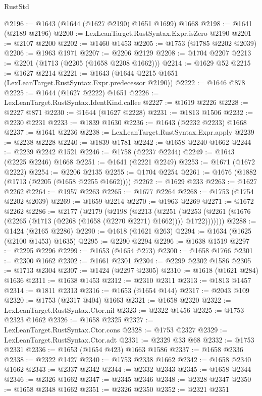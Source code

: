 \begin{lexlean}{RustStd}
\begin{coremodule}
@2196 := @1643 (@1644 (@1627 @2190) @1651 @1699) @1668
@2198 := @1641 (@2189 @2196)
@2200 := LexLeanTarget.RustSyntax.Expr.isZero @2190
@2201 := @2107 @2200
@2202 := @1460 @1453
@2205 := @1753 (@1785 @2202 @2039)
@2206 := @1963 @1971
@2207 := @2206 @2129
@2208 := @1704 @2207
@2213 := @2201 (@1713 (@2205 (@1658 @2208 @1662)))
@2214 := @1629 @52
@2215 := @1627 @2214
@2221 := @1643 (@1644 @2215 @1651 (LexLeanTarget.RustSyntax.Expr.predecessor @2190))
@2222 := @1646 @878
@2225 := @1644 (@1627 @2222) @1651
@2226 := LexLeanTarget.RustSyntax.IdentKind.callee
@2227 := @1619 @2226
@2228 := @2227 @871
@2230 := @1644 (@1627 @2228)
@2231 := @1813 @1506
@2232 := @2230 @2231
@2233 := @1839 @1630
@2236 := @1643 (@2232 @2233) @1668
@2237 := @1641 @2236
@2238 := LexLeanTarget.RustSyntax.Expr.apply
@2239 := @2238 @2228
@2240 := @1839 @1781
@2242 := @1658 @2240 @1662
@2244 := @2239 @2242 @1521
@2246 := @1758 (@2237 @2244)
@2249 := @1643 (@2225 @2246) @1668
@2251 := @1641 (@2221 @2249)
@2253 := @1671 (@1672 @2222)
@2254 := @2206 @2135
@2255 := @1704 @2254
@2261 := @1676 (@1882 (@1713 (@2205 (@1658 @2255 @1662))))
@2262 := @1629 @233
@2263 := @1627 @2262
@2264 := @1957 @2263
@2265 := @1677 @2264
@2268 := @1753 (@1754 @2202 @2039)
@2269 := @1659 @2214
@2270 := @1963 @2269
@2271 := @1672 @2262
@2286 := @2177
    (@2179
      (@2198
        (@2213
          (@2251
            (@2253 (@2261 (@1676 (@2265 (@1713 (@2268 (@1658 (@2270 @2271) @1662)))) @1722)))))))
@2288 := @1424 (@2165 @2286)
@2290 := @1618 (@1621 @263)
@2294 := @1634 (@1625 (@2100 @1453) @1635)
@2295 := @2290 @2294
@2296 := @1638 @1519
@2297 := @2295 @2296
@2299 := @1653 (@1654 @273)
@2300 := @1658 @1766
@2301 := @2300 @1662
@2302 := @1661 @2301
@2304 := @2299 @2302 @1586
@2305 := @1713 @2304
@2307 := @1424 (@2297 @2305)
@2310 := @1618 (@1621 @284) @1636
@2311 := @1638 @1453
@2312 := @2310 @2311
@2313 := @1813 @1457
@2314 := @1811 @2313
@2316 := @1653 (@1654 @144)
@2317 := @2043 @109
@2320 := @1753 (@2317 @404) @1663
@2321 := @1658 @2320
@2322 := LexLeanTarget.RustSyntax.Ctor.nil
@2323 := @2322 @1456
@2325 := @1753 @2323 @1662
@2326 := @1658 @2325
@2327 := LexLeanTarget.RustSyntax.Ctor.cons
@2328 := @1753 @2327
@2329 := LexLeanTarget.RustSyntax.Ctor.adt
@2331 := @2329 @33 @68
@2332 := @1753 @2331
@2336 := @1653 (@1654 @423) @1663 @1586
@2337 := @1658 @2336
@2338 := @2322 @1427
@2340 := @1753 @2338 @1662
@2342 := @1658 @2340 @1662
@2343 := @2337 @2342
@2344 := @2332 @2343
@2345 := @1658 @2344
@2346 := @2326 @1662
@2347 := @2345 @2346
@2348 := @2328 @2347
@2350 := @1658 @2348 @1662
@2351 := @2326 @2350
@2352 := @2321 @2351

\end{coremodule}
\end{lexlean}

